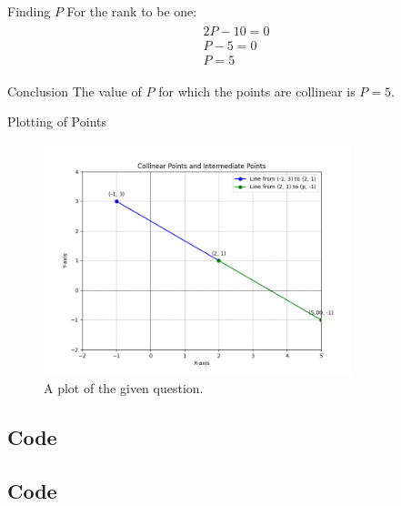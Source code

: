\documentclass{beamer}
\theoremstyle{remark}
\numberwithin{equation}{section}
\begin{document}
\begin{frame}{Finding $P$}
    For the rank to be one:
    \begin{align}
\begin{split}
2P-10=0
\\
P-5=0
\\
P=5
\end{split}
\end{align}
    
\end{frame}

\begin{frame}{Conclusion}
    The value of  $P$ for which the points are collinear is $P = 5$.
\end{frame}

\begin{frame}{Plotting of Points}
\begin{figure}[ht]
	\centering
	\includegraphics[width=0.8\textwidth]{figs/fig.png}
	\caption{A plot of the given question.}
	\label{fig:Plot1}
\end{figure}
\end{frame}
\subsection{Code}
\begin{frame}
    
\end{frame}
\subsection{Code}
\begin{frame}

    
\end{frame}
\end{document}
